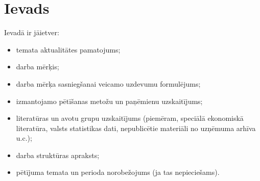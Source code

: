 \chapter{Ievads}
Ievadā ir jāietver:

\begin{itemize}
\item temata aktualitātes pamatojums;
\item darba mērķis;
\item darba mērķa sasniegšanai veicamo uzdevumu formulējums;
\item izmantojamo pētīšanas metožu un paņēmienu uzskaitījums;
\item literatūras un avotu grupu uzskaitījums (piemēram, speciālā ekonomiskā literatūra, valsts statistikas dati, nepublicētie materiāli no uzņēmuma arhīva u.c.);
\item darba struktūras apraksts;
\item pētījuma temata un perioda norobežojums (ja tas nepieciešams).
\end{itemize}
